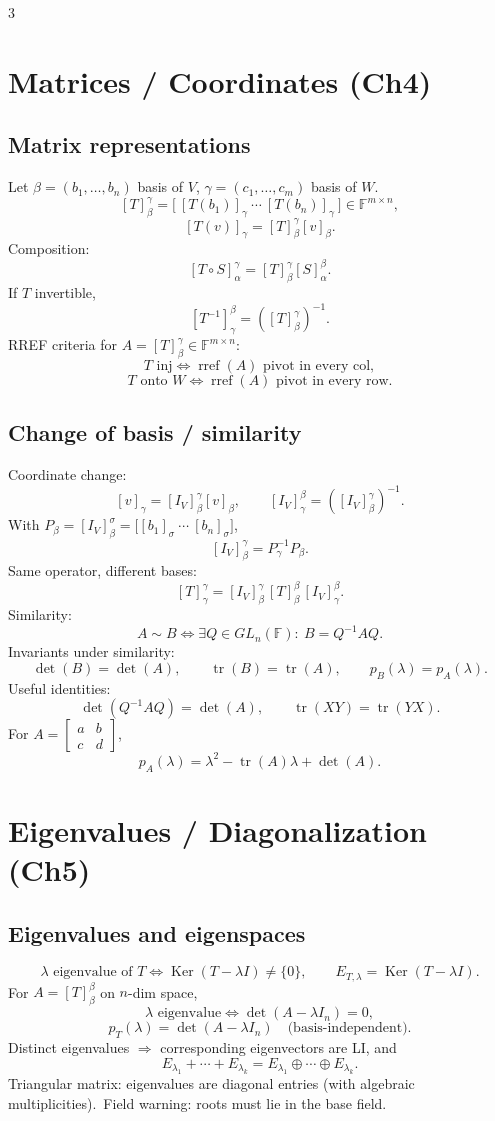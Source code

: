 \documentclass[10pt]{article}
\newcommand{\F}{\mathbb{F}}
\newcommand{\Ker}{\operatorname{Ker}}
\newcommand{\tr}{\operatorname{tr}}
\begin{document}
\begin{multicols}{3}
\section*{Matrices / Coordinates (Ch4)}

\subsection*{Matrix representations}
Let $\beta=(b_1,\dots,b_n)$ basis of $V$, $\gamma=(c_1,\dots,c_m)$ basis of $W$.
\[
[T]^\gamma_\beta=\bigl[\ [T(b_1)]_\gamma\ \cdots\ [T(b_n)]_\gamma\ \bigr]\in\F^{m\times n},
\]
\[
[T(v)]_\gamma=[T]^\gamma_\beta[v]_\beta.
\]
Composition:
\[
[T\circ S]^\gamma_\alpha=[T]^\gamma_\beta[S]^\beta_\alpha.
\]
If $T$ invertible,
\[
[T^{-1}]^\beta_\gamma=([T]^\gamma_\beta)^{-1}.
\]
RREF criteria for $A=[T]^\gamma_\beta\in\F^{m\times n}$:
\[
T\text{ inj}\iff \operatorname{rref}(A)\text{ pivot in every col},
\]
\[
T\text{ onto }W\iff \operatorname{rref}(A)\text{ pivot in every row}.
\]

\subsection*{Change of basis / similarity}
Coordinate change:
\[
[v]_\gamma=[I_V]^\gamma_\beta[v]_\beta,\qquad [I_V]^\beta_\gamma=([I_V]^\gamma_\beta)^{-1}.
\]
With $P_\beta=[I_V]^\sigma_\beta=\bigl[[b_1]_\sigma\ \cdots\ [b_n]_\sigma\bigr]$,
\[
[I_V]^\gamma_\beta=P_\gamma^{-1}P_\beta.
\]
Same operator, different bases:
\[
[T]^\gamma_\gamma=[I_V]^\gamma_\beta\,[T]^\beta_\beta\,[I_V]^\beta_\gamma.
\]
Similarity:
\[
A\sim B\iff \exists Q\in GL_n(\F):\ B=Q^{-1}AQ.
\]
Invariants under similarity:
\[
\det(B)=\det(A),\qquad \tr(B)=\tr(A),\qquad p_B(\lambda)=p_A(\lambda).
\]
Useful identities:
\[
\det(Q^{-1}AQ)=\det(A),\qquad \tr(XY)=\tr(YX).
\]
For $A=\begin{bmatrix}a&b\\ c&d\end{bmatrix}$,
\[
p_A(\lambda)=\lambda^2-\tr(A)\lambda+\det(A).
\]

\section*{Eigenvalues / Diagonalization (Ch5)}

\subsection*{Eigenvalues and eigenspaces}
\[
\lambda\text{ eigenvalue of }T\iff \Ker(T-\lambda I)\neq\{0\},\qquad E_{T,\lambda}=\Ker(T-\lambda I).
\]
For $A=[T]^\beta_\beta$ on $n$-dim space,
\[
\lambda\text{ eigenvalue}\iff \det(A-\lambda I_n)=0,
\]
\[
p_T(\lambda)=\det(A-\lambda I_n)\quad\text{(basis-independent).}
\]
Distinct eigenvalues $\Rightarrow$ corresponding eigenvectors are LI, and
\[
E_{\lambda_1}+\cdots+E_{\lambda_k}=E_{\lambda_1}\oplus\cdots\oplus E_{\lambda_k}.
\]
Triangular matrix: eigenvalues are diagonal entries (with algebraic multiplicities).\
Field warning: roots must lie in the base field.


\end{multicols}
\end{document}
